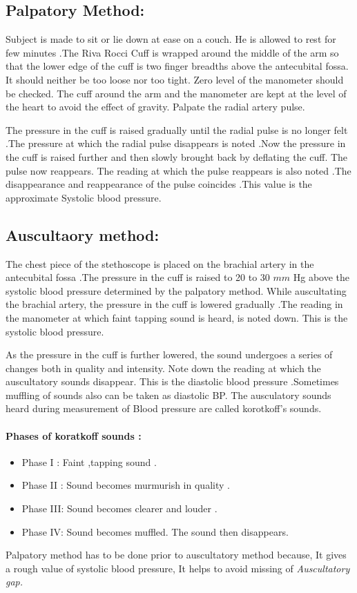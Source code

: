 \documentclass[a4paper,12pt,openany,oneside]{book}
\begin{document}
\subsection*{Palpatory Method:}
Subject is made to sit or lie down at ease on a couch. He is allowed to rest for few minutes .The Riva Rocci Cuff is wrapped around the middle of the arm so that the lower edge of the cuff is two finger breadths above the antecubital fossa. It should neither be too loose nor too tight. Zero level of the manometer should be checked. The cuff around the arm and the manometer are kept at the level of the heart to avoid the effect of gravity. Palpate the radial artery pulse.
\par
The pressure in the cuff is raised gradually until the radial pulse is no longer felt .The pressure at which the radial pulse disappears is noted .Now the pressure in the cuff is raised further and then slowly brought back by deflating the cuff. The pulse now reappears. The reading at which the pulse reappears is also noted .The disappearance and reappearance of the pulse coincides .This value is the approximate Systolic blood pressure.
\subsection*{Auscultaory method:}
The chest piece of the stethoscope is placed on the brachial artery in the antecubital fossa .The pressure in the cuff is raised to 20 to 30 $mm$ Hg above the systolic blood pressure determined by the palpatory method. While auscultating the brachial artery, the pressure in the cuff is lowered gradually .The reading in the manometer at which faint tapping sound is heard, is noted down. This is the systolic blood pressure.
\par
As the pressure in the cuff is further lowered, the sound undergoes a series of changes both in quality and intensity. Note down the reading at which the auscultatory sounds disappear. This is the diastolic blood pressure .Sometimes muffling of sounds also can be taken as diastolic BP. The ausculatory sounds heard during measurement of Blood pressure are called korotkoff’s sounds.
\paragraph{Phases of koratkoff sounds :}
\begin{itemize}
\item[]Phase I : Faint ,tapping sound .
\item[]Phase II : Sound becomes murmurish in quality .
\item[]Phase III: Sound becomes clearer and louder .
\item[]Phase IV: Sound becomes muffled. The sound then disappears.
\end{itemize}
\par
Palpatory method has to be done prior to auscultatory method because,
It gives a rough value of systolic blood pressure, It helps to avoid missing of \emph{Auscultatory gap.}
\end{document}
